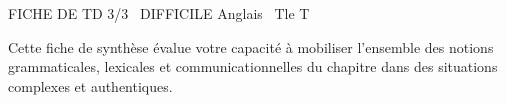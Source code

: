 \documentclass[11pt]{article}
\begin{document}
\begin{tcolorbox}[enhanced,colback=popink,colframe=popink,arc=10pt,boxrule=0pt,left=12pt,right=12pt,top=9pt,bottom=9pt]
{\color{white}\popxbold\small FICHE DE TD 3/3 \textbullet\ DIFFICILE \hfill Anglais \textbullet\ Tle T\par}
\end{tcolorbox}
\vspace{4pt}
Cette fiche de synthèse évalue votre capacité à mobiliser l'ensemble des notions grammaticales, lexicales et communicationnelles du chapitre dans des situations complexes et authentiques.
\end{document}
